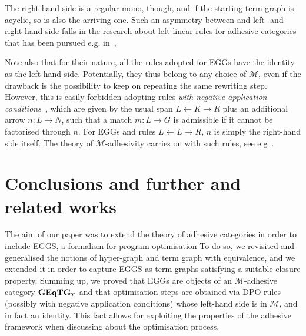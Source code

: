 \documentclass[a4paper,UKenglish,cleveref,pdftex,thm-restate,numberwithinsect]{lipics-v2021}
\newcommand{\catname}[1]{\textbf{\textup{#1}}}
\newcommand{\GEqTGs}{\catname{GEqTG}_{\Sigma}}
\begin{document}
The right-hand side is a regular mono, though, and if the starting term graph is acyclic, so is also the arriving one.
Such an asymmetry between and left- and right-hand side falls in the research about left-linear rules for 
adhesive categories that has 
been pursued e.g. in~\cite{BaldanC0G24}, 

Note also that for their nature, all the rules adopted for EGGs have the identity as the left-hand side. 
Potentially, they thus belong to any choice of $\mathcal{M}$, even if the drawback is the 
possibility to keep on repeating the same rewriting step.
However, this is easily forbidden adopting rules \emph{with negative application conditions}~\cite{xxx}, which are given by the usual span 
$L \leftarrow K \rightarrow R$ plus an additional arrow $n: L\rightarrow N$, such that a match $m: L \to G$ is admissible if it cannot
be factorised through $n$. For EGGs and rules $L \leftarrow L \rightarrow R$, $n$ is simply the right-hand side itself.
%
The theory of $\mathcal{M}$-adhesivity carries on with such rules, see e.g~\cite{xxx}.

\section{Conclusions and further and related works}
\label{conclusioni}
The aim of our paper was to extend the theory of adhesive categories in order to include EGGS, 
a formalism for program optimisation 
%
To do so, we revisited and generalised the notions of hyper-graph and term graph with equivalence, and
we extended it in order to capture EGGS as term graphs satisfying a suitable closure property.
Summing up, we proved that EGGs are objects of an $\mathcal{M}$-adhesive category $\GEqTGs$ 
and that optimisation steps are obtained via DPO rules (possibly with negative application conditions) whose 
left-hand side is in $\mathcal{M}$, and in fact an identity. 
This fact allows for exploiting the properties 
of the adhesive framework when discussing about the optimisation process.
\end{document}
